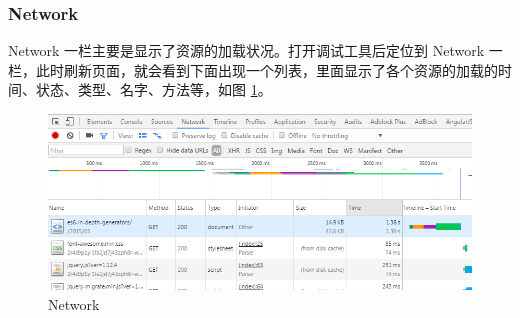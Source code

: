             \subsubsection{Network}
              \label{subsubsec:network}
                Network 一栏主要是显示了资源的加载状况。打开调试工具后定位到 Network 一栏，此时刷新页面，就会看到下面出现一个列表，里面显示了各个资源的加载的时间、状态、类型、名字、方法等，如图 \ref{fig:cr_network}。
                \begin{figure}[htbp]
                  \centering
                  \includegraphics[width=12cm]{./img/cr_network.png}
                  \caption{Network}
                  \label{fig:cr_network}
                \end{figure}

